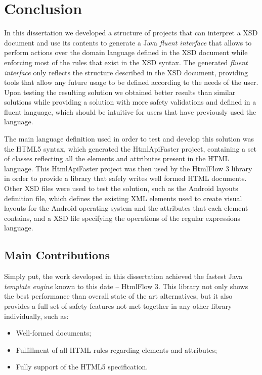 \chapter{Conclusion}
\label{cha:conclusion}

In this dissertation we developed a structure of projects that can interpret a \ac{XSD} document and use its contents to generate a Java \textit{fluent interface} that allows to perform actions over the domain language defined in the \ac{XSD} document while enforcing most of the rules that exist in the \ac{XSD} syntax. The generated \textit{fluent interface} only reflects the structure described in the \ac{XSD} document, providing tools that allow any future usage to be defined according to the needs of the user. Upon testing the resulting solution we obtained better results than similar solutions while providing a solution with more safety validations and defined in a fluent language, which should be intuitive for users that have previously used the language.

\noindent
The main language definition used in order to test and develop this solution was the \ac{HTML}5 syntax, which generated the HtmlApiFaster project, containing a set of classes reflecting all the elements and attributes present in the \ac{HTML} language. This HtmlApiFaster project was then used by the HtmlFlow 3 library in order to provide a library that safely writes well formed \ac{HTML} documents. Other \ac{XSD} files were used to test the solution, such as the Android layouts definition file, which defines the existing \ac{XML} elements used to create visual layouts for the Android operating system and the attributes that each element contains, and a \ac{XSD} file specifying the operations of the regular expressions language.

\section{Main Contributions}
\label{sec:maincontributions}

Simply put, the work developed in this dissertation achieved the fastest Java \textit{template engine} known to this date – HtmlFlow 3. This library not only shows the best performance than overall state of the art alternatives, but it also provides a full set of safety features not met together in any other library individually, such as: 

\begin{itemize}
	\item Well-formed documents;
	\item Fulfillment of all \ac{HTML} rules regarding elements and attributes;
	\item Fully support of the \ac{HTML}5 specification.
\end{itemize}


